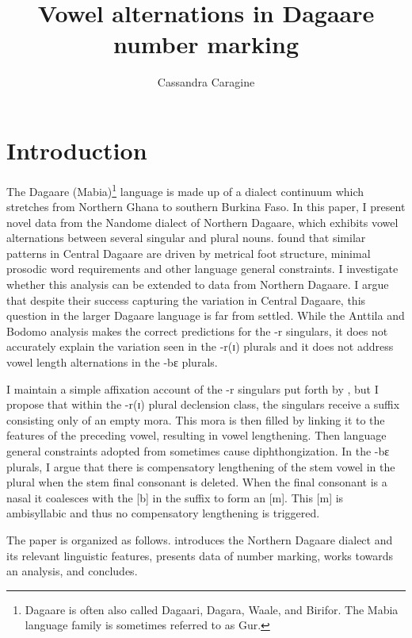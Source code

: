 \documentclass[output=paper,colorlinks,citecolor=brown,
]{langscibook}
\author{Cassandra Caragine\affiliation{University of Maryland}}
\title{Vowel alternations in {D}agaare number marking}
\begin{document}
\maketitle

\section{Introduction}
\label{sec:caragine:intro}

The Dagaare (Mabia)\footnote{Dagaare is often also called Dagaari, Dagara, Waale, and Birifor. The Mabia language family is sometimes referred to as Gur.} language is made up of a dialect continuum which stretches from Northern Ghana to southern Burkina Faso. In this paper, I present novel data from the Nandome dialect of Northern Dagaare, which exhibits vowel alternations between several singular and plural nouns. \citet{anttilaProsodic2009, anttilaMetrically2019} found that similar patterns in Central Dagaare are driven by metrical foot structure, minimal prosodic word requirements and other language general constraints. I investigate whether this analysis can be extended to data from Northern Dagaare. I argue that despite their success capturing the variation in Central Dagaare, this question in the larger Dagaare language is far from settled. While the Anttila and Bodomo analysis makes the correct predictions for the -r singulars, it does not accurately explain the variation seen in the -r(ɪ) plurals and it does not address vowel length alternations in the -bɛ plurals. 

I maintain a simple affixation account of the -r singulars put forth by \citet{anttilaProsodic2009}, but I propose that within the -r(ɪ) plural declension class, the singulars receive a suffix consisting only of an empty mora. This mora is then filled by linking it to the features of the preceding vowel, resulting in vowel lengthening. Then language general constraints adopted from \citet{anttilaProsodic2009} sometimes cause diphthongization. In the -bɛ plurals, I argue that there is compensatory lengthening of the stem vowel in the plural when the stem final consonant is deleted. When the final consonant is a nasal it coalesces with the [b] in the suffix to form an [m]. This [m] is ambisyllabic and thus no compensatory lengthening is triggered.

The paper is organized as follows.  introduces the Northern Dagaare dialect and its relevant linguistic features,   presents data of number marking,  works towards an analysis, and  concludes.
\end{document}
